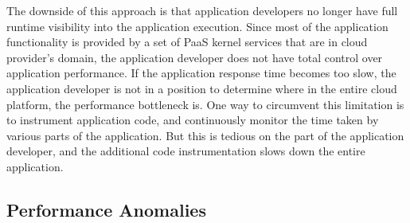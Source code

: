 The downside of this approach is that application developers no longer have full runtime visibility
into the application execution. Since most of the application functionality is provided by a set 
of PaaS kernel services that are in cloud provider's domain, the application
developer does not have total control over application performance. If the application 
response time becomes too slow, the application developer is not in a position to determine
where in the entire cloud platform, the performance bottleneck is. One way to circumvent this 
limitation is to instrument application code, and continuously monitor the time taken by various
parts of the application. But this is tedious on the part of the application developer, and
the additional code instrumentation slows down the entire application.

\subsection{Performance Anomalies}